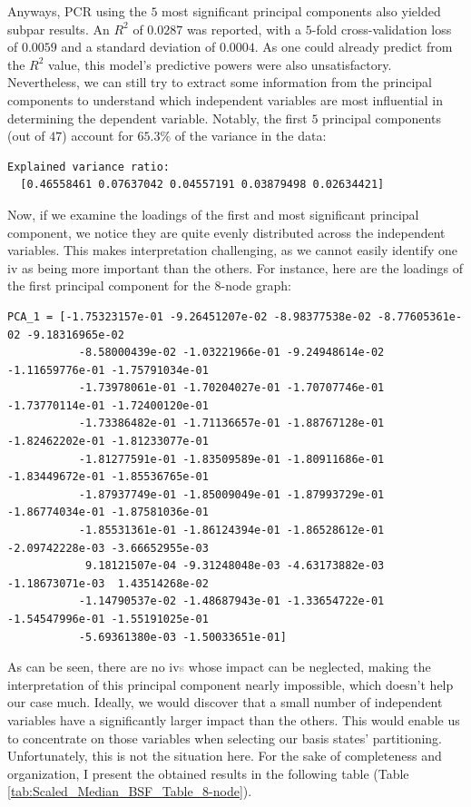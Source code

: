 Anyways, PCR using the $5$ most significant principal components also yielded subpar results. An $R^2$ of $0.0287$ was reported, with a $5$-fold cross-validation loss of $0.0059$ and a standard deviation of $0.0004$. As one could already predict from the $R^2$ value, this model's predictive powers were also unsatisfactory. Nevertheless, we can still try to extract some information from the principal components to understand which independent variables are most influential in determining the dependent variable. Notably, the first $5$ principal components (out of $47$) account for $65.3\%$ of the variance in the data:
\begin{lstlisting}[caption={Explained variance ratio, for the first 5 PCs ($8$-node graph).}, captionpos=b, style=DOS]
  Explained variance ratio:
  [0.46558461 0.07637042 0.04557191 0.03879498 0.02634421]
\end{lstlisting}
Now, if we examine the loadings of the first and most significant principal component, we notice they are quite evenly distributed across the independent variables. This makes interpretation challenging, as we cannot easily identify one \acrshort{iv} as being more important than the others. For instance, here are the loadings of the first principal component for the $8$-node graph:
\begin{lstlisting}[caption={Loadings of the first PC, for the 8-node graph.}, captionpos=b, style=DOS]
  PCA_1 = [-1.75323157e-01 -9.26451207e-02 -8.98377538e-02 -8.77605361e-02 -9.18316965e-02
           -8.58000439e-02 -1.03221966e-01 -9.24948614e-02 -1.11659776e-01 -1.75791034e-01
           -1.73978061e-01 -1.70204027e-01 -1.70707746e-01 -1.73770114e-01 -1.72400120e-01
           -1.73386482e-01 -1.71136657e-01 -1.88767128e-01 -1.82462202e-01 -1.81233077e-01
           -1.81277591e-01 -1.83509589e-01 -1.80911686e-01 -1.83449672e-01 -1.85536765e-01
           -1.87937749e-01 -1.85009049e-01 -1.87993729e-01 -1.86774034e-01 -1.87581036e-01
           -1.85531361e-01 -1.86124394e-01 -1.86528612e-01 -2.09742228e-03 -3.66652955e-03
            9.18121507e-04 -9.31248048e-03 -4.63173882e-03 -1.18673071e-03  1.43514268e-02
           -1.14790537e-02 -1.48687943e-01 -1.33654722e-01 -1.54547996e-01 -1.55191025e-01
           -5.69361380e-03 -1.50033651e-01]
  \end{lstlisting}
As can be seen, there are no \acrshort{iv}\textcolor{gray}{s} whose impact can be neglected, making the interpretation of this principal component nearly impossible, which doesn't help our case much. Ideally, we would discover that a small number of independent variables have a significantly larger impact than the others. This would enable us to concentrate on those variables when selecting our basis states' partitioning. Unfortunately, this is not the situation here. For the sake of completeness and organization, I present the obtained results in the following table (Table \ref{tab:Scaled_Median_BSF_Table_8-node}).
